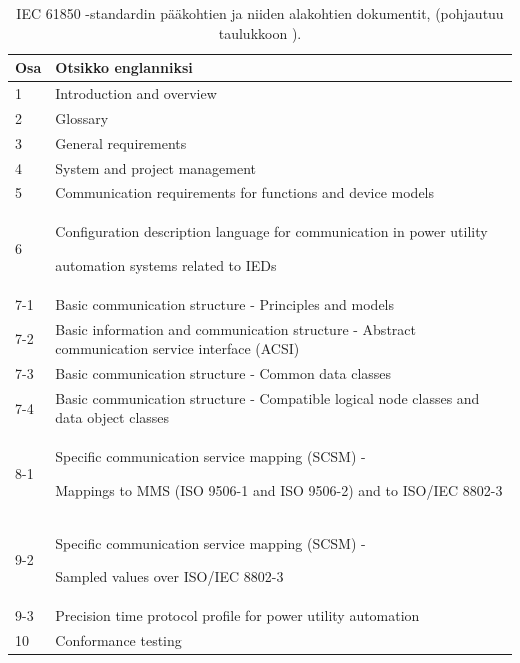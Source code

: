 \begin{table}[ht!]
	\caption{IEC 61850 -standardin pääkohtien ja niiden alakohtien dokumentit, (pohjautuu taulukkoon \mbox{\cite[s.~2]{Mackiewicz2006}}).}
	\label{tab:iec61850-dokumentin-osat}
	\begin{tabular}{l | l}
		\hline
		\textbf{Osa} & \textbf{Otsikko englanniksi} \\
		\hline \hline
		1 & Introduction and overview \\
		2 & Glossary \\
		3 & General requirements \\
		4 & System and project management \\
		5 & \parbox[t]{13cm}{Communication requirements for functions and device models} \\
		6 & \parbox[t]{13cm}{Configuration description language for communication in power utility \par automation systems related to IEDs} \\
		7-1 & \parbox[t]{13cm}{Basic communication structure - Principles and models} \\
		7-2 & \parbox[t]{13cm}{Basic information and communication structure - Abstract communication service interface (ACSI)} \\
		7-3 & \parbox[t]{13cm}{Basic communication structure - Common data classes} \\
		7-4 & \parbox[t]{13cm}{Basic communication structure - Compatible logical node classes and data object classes} \\
		8-1 & \parbox[t]{13cm}{Specific communication service mapping (SCSM) - \par  Mappings to MMS (ISO 9506-1 and ISO 9506-2) and to ISO/IEC 8802-3} \\
		9-2 & \parbox[t]{13cm}{Specific communication service mapping (SCSM) - \par  Sampled values over ISO/IEC 8802-3} \\
		9-3 & \parbox[t]{13cm}{Precision time protocol profile for power utility automation} \\
		10 & Conformance testing \\
		\hline
	\end{tabular}
\end{table}

